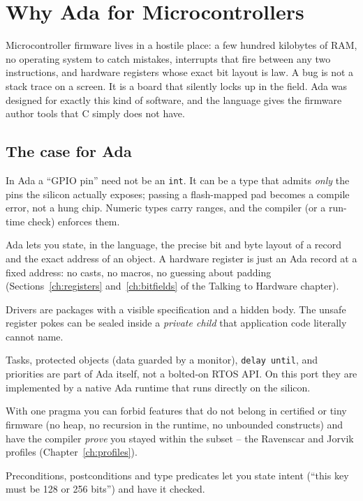 \chapter{Why Ada for Microcontrollers}

Microcontroller firmware lives in a hostile place: a few hundred kilobytes of
RAM, no operating system to catch mistakes, interrupts that fire between any two
instructions, and hardware registers whose exact bit layout is law. A bug is not
a stack trace on a screen. It is a board that silently locks up in the field.
Ada was designed for exactly this kind of software, and the language gives the
firmware author tools that C simply does not have.

\section{The case for Ada}

\begin{description}[style=nextline]
\item[Strong, range-checked types.] In Ada a ``GPIO pin'' need not be an
  \texttt{int}. It can be a type that admits \emph{only} the pins the silicon
  actually exposes; passing a flash-mapped pad becomes a compile error, not a
  hung chip. Numeric types carry ranges, and the compiler (or a run-time check)
  enforces them.
\item[Representation control.] Ada lets you state, in the language, the precise
  bit and byte layout of a record and the exact address of an object. A hardware
  register is just an Ada record at a fixed address: no casts, no macros, no
  guessing about padding (Sections~\ref{ch:registers} and~\ref{ch:bitfields} of
  the Talking to Hardware chapter).
\item[Packages and strong interfaces.] Drivers are packages with a visible
  specification and a hidden body. The unsafe register pokes can be sealed inside
  a \emph{private child} that application code literally cannot name.
\item[Tasking and real-time in the language.] Tasks, protected objects (data
  guarded by a monitor), \texttt{delay until}, and priorities are part of Ada
  itself, not a bolted-on RTOS API. On this port they are implemented by a
  native Ada runtime that runs directly on the silicon.
\item[Restriction profiles.] With one pragma you can forbid features that do not
  belong in certified or tiny firmware (no heap, no recursion in the runtime, no
  unbounded constructs) and have the compiler \emph{prove} you stayed within the
  subset -- the Ravenscar and Jorvik profiles (Chapter~\ref{ch:profiles}).
\item[Contracts.] Preconditions, postconditions and type predicates let you
  state intent (``this key must be 128 or 256 bits'') and have it checked.
\end{description}

